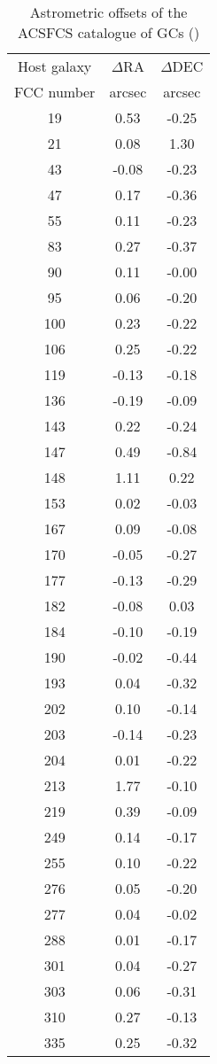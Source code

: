 \documentclass[fleqn,usenatbib]{mnras}
\begin{document}
\begin{table}
\centering
\caption{Astrometric offsets of the ACSFCS catalogue of GCs (\citealp{jordan2015})}
\begin{tabular}{ c c c } \hline  
Host galaxy & $\Delta$RA & $\Delta$DEC \\
FCC number & arcsec & arcsec  \\ 
\hline
19  & 0.53  & -0.25 \\
21  & 0.08  & 1.30 \\
43  & -0.08  & -0.23 \\
47  & 0.17  & -0.36 \\
55  & 0.11  & -0.23 \\
83  & 0.27  & -0.37 \\
90  & 0.11  & -0.00 \\
95  & 0.06  & -0.20 \\
100  & 0.23  & -0.22 \\
106  & 0.25  & -0.22 \\
119  & -0.13  & -0.18 \\
136  & -0.19  & -0.09 \\
143  & 0.22  & -0.24 \\
147  & 0.49  & -0.84 \\
148  & 1.11  & 0.22 \\
153  & 0.02  & -0.03 \\
167  & 0.09  & -0.08 \\
170  & -0.05  & -0.27 \\
177  & -0.13  & -0.29 \\
182  & -0.08  & 0.03 \\
184  & -0.10  & -0.19 \\
190  & -0.02  & -0.44 \\
193  & 0.04  & -0.32 \\
202  & 0.10  & -0.14 \\
203  & -0.14  & -0.23 \\
204  & 0.01  & -0.22 \\
213  & 1.77  & -0.10 \\
219  & 0.39  & -0.09 \\
249  & 0.14  & -0.17 \\
255  & 0.10  & -0.22 \\
276  & 0.05  & -0.20 \\
277  & 0.04  & -0.02 \\
288  & 0.01  & -0.17 \\
301  & 0.04  & -0.27 \\
303  & 0.06  & -0.31 \\
310  & 0.27  & -0.13 \\
335  & 0.25  & -0.32 \\
\hline 
\end{tabular}
\label{acscorr}
\end{table}
\end{document}
